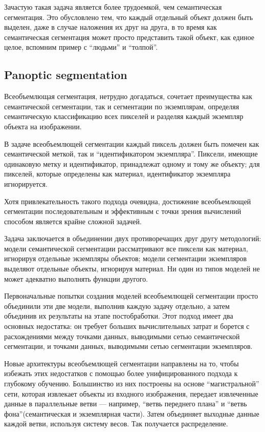 Зачастую такая задача является более трудоемкой, чем семантическая сегментация. Это обусловлено тем, что каждый отдельный объект должен быть выделен, даже в случае наложения их друг на друга, в то время как семантическая сегментация может просто представить такой объект, как единое целое, вспомним пример с “людьми” и “толпой”.

\subsection{Panoptic segmentation}

Всеобъемлющая сегментация, нетрудно догадаться, сочетает преимущества как семантической сегментации, так и сегментации по экземплярам, определяя семантическую классификацию всех пикселей и разделяя каждый экземпляр объекта на изображении.

В задаче всеобъемлющей сегментации каждый пиксель должен быть помечен как семантической меткой, так и “идентификатором экземпляра”. Пиксели, имеющие одинаковую метку и идентификатор, принадлежат одному и тому же объекту; для пикселей, которые определены как материал, идентификатор экземпляра игнорируется.

Хотя привлекательность такого подхода очевидна, достижение всеобъемлющей сегментации последовательным и эффективным с точки зрения вычислений способом является крайне сложной задачей.

Задача заключается в объединении двух противоречащих друг другу методологий: модели семантической сегментации рассматривают все пиксели как материал, игнорируя отдельные экземпляры объектов; модели сегментации экземпляров выделяют отдельные объекты, игнорируя материал. Ни один из типов моделей не может адекватно выполнять функции другого.

Первоначальные попытки создания моделей всеобъемлющей сегментации просто объединили эти две модели, выполнив каждую задачу отдельно, а затем объединив их результаты на этапе постобработки. Этот подход имеет два основных недостатка: он требует больших вычислительных затрат и борется с расхождениями между точками данных, выводимыми сетью семантической сегментации, и точками данных, выводимыми сетью сегментации экземпляров.

Новые архитектуры всеобъемлющей сегментации направлены на то, чтобы избежать этих недостатков с помощью более унифицированного подхода к глубокому обучению. Большинство из них построены на основе “магистральной” сети, которая извлекает объекты из входного изображения, передает извлеченные данные в параллельные ветви — например, “ветвь переднего плана” и “ветвь фона”(семантическая и экземплярная части). Затем объединяет выходные данные каждой ветви, используя систему весов. Так получается распределение.

